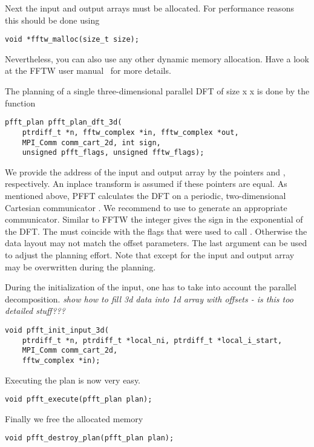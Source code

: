 Next the input and output arrays must be allocated. For performance reasons this should be done using
\begin{lstlisting}
void *fftw_malloc(size_t size);
\end{lstlisting}
Nevertheless, you can also use any other dynamic memory allocation. Have a look at the FFTW user manual~\cite{FFTW05}
for more details.

The planning of a single three-dimensional parallel DFT of size  x  x  is done by the function
\begin{lstlisting}
pfft_plan pfft_plan_dft_3d(
    ptrdiff_t *n, fftw_complex *in, fftw_complex *out,
    MPI_Comm comm_cart_2d, int sign,
    unsigned pfft_flags, unsigned fftw_flags);
\end{lstlisting}
We provide the address of the input and output array by the pointers  and ,
respectively. An inplace transform is assumed if these pointers are equal. As mentioned above,
PFFT calculates the DFT on a periodic, two-dimensional Cartesian communicator .
We recommend to use  to generate an appropriate communicator.
Similar to FFTW the integer  gives the sign in the exponential of the DFT. The
 must coincide with the flags that were used to call .
Otherwise the data layout may not match the offset parameters. The last argument 
can be used to adjust the planning effort. Note that except for  the input and
output array may be overwritten during the planning.


During the initialization of the input, one has to take into account the parallel decomposition.
\emph{show how to fill 3d data into 1d array with offsets - is this too detailed stuff???}

\begin{lstlisting}
void pfft_init_input_3d(
    ptrdiff_t *n, ptrdiff_t *local_ni, ptrdiff_t *local_i_start,
    MPI_Comm comm_cart_2d,
    fftw_complex *in);
\end{lstlisting}



Executing the plan is now very easy.
\begin{lstlisting}
void pfft_execute(pfft_plan plan);
\end{lstlisting}

Finally we free the allocated memory
\begin{lstlisting}
void pfft_destroy_plan(pfft_plan plan);
\end{lstlisting}

